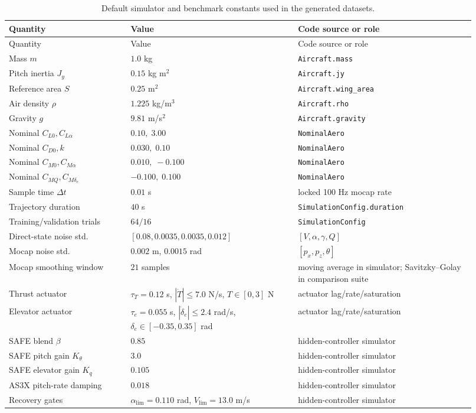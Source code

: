 \documentclass[11pt]{article}
\begin{document}
\begingroup
\small
\begin{longtable}{@{}p{0.24\linewidth}p{0.33\linewidth}p{0.35\linewidth}@{}}
\caption{Default simulator and benchmark constants used in the generated datasets.}
\label{tab:simulation_defaults}\\
\toprule
Quantity & Value & Code source or role \\
\midrule
\endfirsthead
\toprule
Quantity & Value & Code source or role \\
\midrule
\endhead
Mass $m$ & $1.0$ kg & \texttt{Aircraft.mass} \\
Pitch inertia $J_y$ & $0.15$ kg m$^2$ & \texttt{Aircraft.jy} \\
Reference area $S$ & $0.25$ m$^2$ & \texttt{Aircraft.wing\_area} \\
Air density $\rho$ & $1.225$ kg/m$^3$ & \texttt{Aircraft.rho} \\
Gravity $g$ & $9.81$ m/s$^2$ & \texttt{Aircraft.gravity} \\
Nominal $C_{L0}, C_{L\alpha}$ & $0.10,\;3.00$ & \texttt{NominalAero} \\
Nominal $C_{D0}, k$ & $0.030,\;0.10$ & \texttt{NominalAero} \\
Nominal $C_{M0}, C_{M\alpha}$ & $0.010,\;-0.100$ & \texttt{NominalAero} \\
Nominal $C_{MQ}, C_{M\delta_e}$ & $-0.100,\;0.100$ & \texttt{NominalAero} \\
Sample time $\Delta t$ & $0.01$ s & locked 100 Hz mocap rate \\
Trajectory duration & $40$ s & \texttt{SimulationConfig.duration} \\
Training/validation trials & $64/16$ & \texttt{SimulationConfig} \\
Direct-state noise std. & $[0.08,0.0035,0.0035,0.012]$ & $[V,\alpha,\gamma,Q]$ \\
Mocap noise std. & $0.002$ m, $0.0015$ rad & $[p_x,p_z,\theta]$ \\
Mocap smoothing window & $21$ samples & moving average in simulator; Savitzky--Golay in comparison suite \\
Thrust actuator & $\tau_T=0.12$ s, $|\dot{T}|\le 7.0$ N/s, $T\in[0,3]$ N & actuator lag/rate/saturation \\
Elevator actuator & $\tau_e=0.055$ s, $|\dot{\delta}_e|\le 2.4$ rad/s, $\delta_e\in[-0.35,0.35]$ rad & actuator lag/rate/saturation \\
SAFE blend $\beta$ & $0.85$ & hidden-controller simulator \\
SAFE pitch gain $K_\theta$ & $3.0$ & hidden-controller simulator \\
SAFE elevator gain $K_q$ & $0.105$ & hidden-controller simulator \\
AS3X pitch-rate damping & $0.018$ & hidden-controller simulator \\
Recovery gates & $\alpha_{\lim}=0.110$ rad, $V_{\lim}=13.0$ m/s & hidden-controller simulator \\
\bottomrule
\end{longtable}
\endgroup
\end{document}
